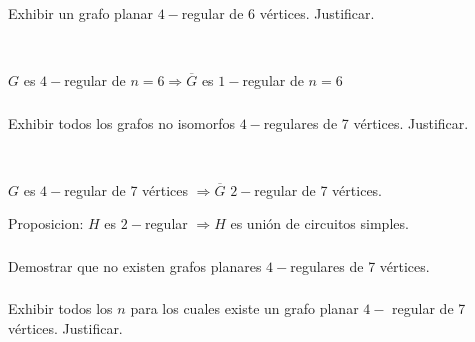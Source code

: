 \subsubsection{}
Exhibir un grafo planar $4-$regular de 6 vértices. Justificar.

~

$G$ es $4-$regular de $n = 6 \Longrightarrow \overline{G}$ es $1-$regular de $n = 6$

\subsubsection{}
Exhibir todos los grafos no isomorfos $4-$regulares de 7 vértices. Justificar.

~

$G$ es $4-$regular de 7 vértices $\Longrightarrow \overline{G}$ $2-$regular de 7 vértices.

Proposicion: $H$ es $2-$regular $\Longrightarrow H$ es unión de circuitos simples.

\subsubsection{}
Demostrar que no existen grafos planares $4-$regulares de 7 vértices.

\subsubsection{}
Exhibir todos los $n$ para los cuales existe un grafo planar $4-$ regular de 7 vértices. Justificar.